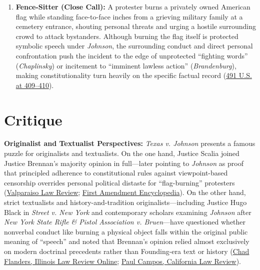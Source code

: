 \documentclass[12pt]{article}
\begin{document}
\begin{enumerate}
    \item \textbf{Fence-Sitter (Close Call):} A protester burns a privately owned American flag while standing face-to-face inches from a grieving military family at a cemetery entrance, shouting personal threats and urging a hostile surrounding crowd to attack bystanders. Although burning the flag itself is protected symbolic speech under \textit{Johnson}, the surrounding conduct and direct personal confrontation push the incident to the edge of unprotected ``fighting words'' (\textit{Chaplinsky}) or incitement to ``imminent lawless action'' (\textit{Brandenburg}), making constitutionality turn heavily on the specific factual record (\href{https://supreme.justia.com/cases/federal/us/491/397/}{491 U.S. at 409--410}).
\end{enumerate}

\section{Critique}
\textbf{Originalist and Textualist Perspectives:} \textit{Texas v. Johnson} presents a famous puzzle for originalists and textualists. On the one hand, Justice Scalia joined Justice Brennan's majority opinion in full---later pointing to \textit{Johnson} as proof that principled adherence to constitutional rules against viewpoint-based censorship overrides personal political distaste for ``flag-burning'' protesters (\href{https://scholar.valpo.edu/cgi/viewcontent.cgi?article=1450&context=law_fac_pubs}{Valparaiso Law Review}; \href{https://firstamendment.mtsu.edu/article/antonin-scalia/}{First Amendment Encyclopedia}). On the other hand, strict textualists and history-and-tradition originalists---including Justice Hugo Black in \textit{Street v. New York} and contemporary scholars examining \textit{Johnson} after \textit{New York State Rifle \& Pistol Association v. Bruen}---have questioned whether nonverbal conduct like burning a physical object falls within the original public meaning of ``speech'' and noted that Brennan's opinion relied almost exclusively on modern doctrinal precedents rather than Founding-era text or history (\href{https://illinoislawreview.org/wp-content/uploads/2022/10/Flanders.pdf}{Chad Flanders, Illinois Law Review Online}; \href{https://scholar.law.colorado.edu/cgi/viewcontent.cgi?article=1739&context=faculty-articles}{Paul Campos, California Law Review}).
\end{document}
